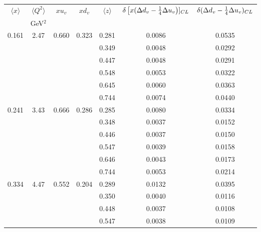 \begin{table}[htbp]
\begin{center}
\begin{tabular}{|ccccc||c|c|}
\hline
$\langle x \rangle $   & $ \langle Q^2 \rangle $   & $x  u_v$ & $x d_v$ & $\langle z \rangle$ & $\delta \left[x( \Delta d_v -{1 \over 4} \Delta u_v \right)]_{CL}$  &
$\delta ( \Delta d_v -{1 \over 4} \Delta u_v )_{CL}$  \\
                       & GeV$^2$              &          &    &       &     &                                                              \\ \hline \hline
   0.161 &    2.47 &   0.660 &    0.323 &    0.281 &    0.0086 &    0.0535 \\
         &          &          &          &    0.349 &    0.0048 &    0.0292 \\
         &          &          &          &    0.447 &    0.0048 &    0.0291 \\
         &          &          &          &    0.548 &    0.0053 &    0.0322 \\
         &          &          &          &    0.645 &    0.0060 &    0.0363 \\
         &          &          &          &    0.744 &    0.0074 &    0.0440 \\
   0.241 &    3.43 &   0.666 &    0.286 &    0.285 &    0.0080 &    0.0334 \\
         &          &          &          &    0.348 &    0.0037 &    0.0152 \\
         &          &          &          &    0.446 &    0.0037 &    0.0150 \\
         &          &          &          &    0.547 &    0.0039 &    0.0158 \\
         &          &          &          &    0.646 &    0.0043 &    0.0173 \\
         &          &          &          &    0.744 &    0.0053 &    0.0214 \\
   0.334 &    4.47 &   0.552 &    0.204 &    0.289 &    0.0132 &    0.0395 \\
         &          &          &          &    0.350 &    0.0040 &    0.0116 \\
         &          &          &          &    0.448 &    0.0037 &    0.0108 \\
         &          &          &          &    0.547 &    0.0038 &    0.0109 \\

\end{tabular}
\end{center}
\end{table}
